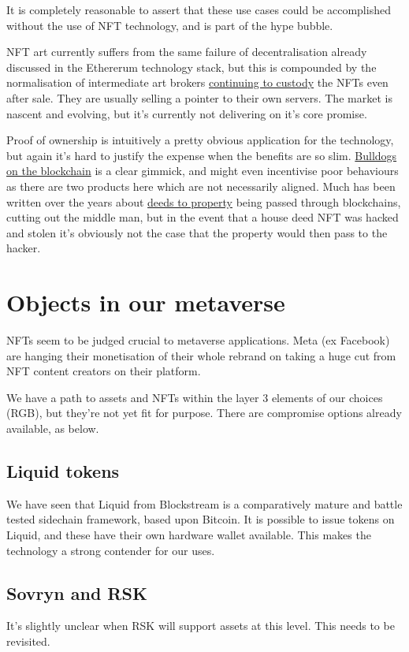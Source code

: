 It is completely reasonable to assert that these use cases could be accomplished without the use of NFT technology, and is part of the hype bubble.\par
NFT art currently suffers from the same failure of decentralisation already discussed in the Ethererum technology stack, but this is compounded by the normalisation of intermediate art brokers \href{https://moxie.org/2022/01/07/web3-first-impressions.html}{continuing to custody} the NFTs even after sale. They are usually selling a pointer to their own servers. The market is nascent and evolving, but it's currently not delivering on it's core promise.\par
Proof of ownership is intuitively a pretty obvious application for the technology, but again it's hard to justify the expense when the benefits are so slim. \href{https://www.bullishlybred.com/}{Bulldogs on the blockchain} is a clear gimmick, and might even incentivise poor behaviours as there are two products here which are not necessarily aligned. Much has been written over the years about \href{https://propy.com/browse/propy-nft/}{deeds to property} being passed through blockchains, cutting out the middle man, but in the event that a house deed NFT was hacked and stolen it's obviously not the case that the property would then pass to the hacker.

\section{Objects in our metaverse}
NFTs seem to be judged crucial to metaverse applications. Meta (ex Facebook) are hanging their monetisation of their whole rebrand on taking a huge cut from NFT content creators on their platform.\par
We have a path to assets and NFTs within the layer 3 elements of our choices (RGB), but they're not yet fit for purpose. There are compromise options already available, as below.
\subsection{Liquid tokens}
We have seen that Liquid from Blockstream is a comparatively mature and battle tested sidechain framework, based upon Bitcoin. It is possible to issue tokens on Liquid, and these have their own hardware wallet available. This makes the technology a strong contender for our uses.
\subsection{Sovryn and RSK}
It's slightly unclear when RSK will support assets at this level. This needs to be revisited.
